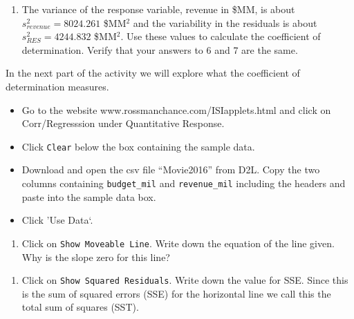 \documentclass[
]{report}
\providecommand{\tightlist}{%
  \setlength{\itemsep}{0pt}\setlength{\parskip}{0pt}}
\begin{document}
\vspace{.4in}

\begin{enumerate}
\def\labelenumi{\arabic{enumi}.}
\setcounter{enumi}{6}
\tightlist
\item
  The variance of the response variable, revenue in \$MM, is about \(s_{revenue}^2 = 8024.261\) \$MM\(^2\) and the variability in the residuals is about \(s_{RES}^2 = 4244.832\) \$MM\(^2\). Use these values to calculate the coefficient of determination. Verify that your answers to 6 and 7 are the same.
\end{enumerate}

\vspace{1in}

In the next part of the activity we will explore what the coefficient of determination measures.

\begin{itemize}
\item
  Go to the website www.rossmanchance.com/ISIapplets.html and click on Corr/Regresssion under Quantitative Response.
\item
  Click \texttt{Clear} below the box containing the sample data.
\item
  Download and open the csv file ``Movie2016'' from D2L. Copy the two columns containing \texttt{budget\_mil} and \texttt{revenue\_mil} including the headers and paste into the sample data box.
\item
  Click 'Use Data`.
\end{itemize}

\begin{enumerate}
\def\labelenumi{\arabic{enumi}.}
\setcounter{enumi}{7}
\tightlist
\item
  Click on \texttt{Show\ Moveable\ Line}. Write down the equation of the line given. Why is the slope zero for this line?
\end{enumerate}

\vspace{0.8in}

\begin{enumerate}
\def\labelenumi{\arabic{enumi}.}
\setcounter{enumi}{8}
\tightlist
\item
  Click on \texttt{Show\ Squared\ Residuals}. Write down the value for SSE. Since this is the sum of squared errors (SSE) for the horizontal line we call this the total sum of squares (SST).
\end{enumerate}

\newpage
\end{document}
